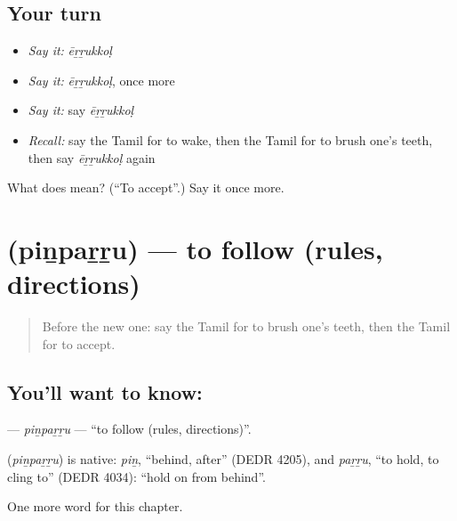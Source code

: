 \subsection*{Your turn}
\begin{itemize}
\raggedright
  \item \emph{Say it:} \emph{ēṟṟukkoḷ}
  \item \emph{Say it:} \emph{ēṟṟukkoḷ}, once more
  \item \emph{Say it:} say \emph{ēṟṟukkoḷ}
  \item \emph{Recall:} say the Tamil for to wake, then the Tamil for to brush one's teeth, then say \emph{ēṟṟukkoḷ} again
\end{itemize}

\begin{tcolorbox}[breakable,colback=teal!4,colframe=teal!35!black,title={Before you move on}]
What does  mean? (\textquotedblleft{}To accept\textquotedblright{}.) Say it once more.
\end{tcolorbox}
\section[\texorpdfstring{\ta{பின்பற்று} (piṉpaṟṟu)}{பின்பற்று (piṉpaṟṟu)}]{ (piṉpaṟṟu) — to follow (rules, directions)}

\label{lesson:TA-C256-pinparru}



\begin{quote}
Before the new one: say the Tamil for to brush one's teeth, then the Tamil for to accept.
\end{quote}

\subsection*{You'll want to know: }
\textbf{} — \emph{piṉpaṟṟu} — \textquotedblleft{}to follow (rules, directions)\textquotedblright{}.

\begin{cousinweb}
\textbf{} (\emph{piṉpaṟṟu}) is native: \emph{piṉ}, \textquotedblleft{}behind, after\textquotedblright{} (DEDR 4205), and \emph{paṟṟu}, \textquotedblleft{}to hold, to cling to\textquotedblright{} (DEDR 4034): \textquotedblleft{}hold on from behind\textquotedblright{}.
\end{cousinweb}

\begin{grammarlens}[title={What you've built}]
One more word for this chapter.
\end{grammarlens}

